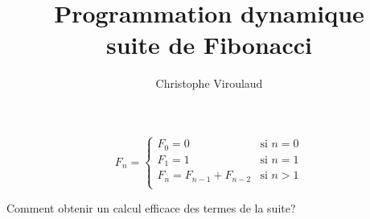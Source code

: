 \documentclass[svgnames,11pt]{beamer}
\author[]{Christophe Viroulaud}
\title{Programmation dynamique\\suite de Fibonacci}
\date{\framebox{\textbf{Algo 24}}}
\institute{Terminale - NSI}
\begin{document}
\begin{frame}
\titlepage
\end{frame}
\begin{frame}
    \frametitle{}
    $$
        F_n = \left\{
        \begin{array}{ll}
            F_0 = 0                 & \mbox{si } n=0 \\
            F_1=1                   & \mbox{si } n=1 \\
            F_{n} = F_{n-1}+F_{n-2} & \mbox{si } n>1 \\
        \end{array}
        \right.
    $$
    \begin{framed}
        \centering Comment obtenir un calcul efficace des termes de la suite?
    \end{framed}
\end{frame}
\end{document}
